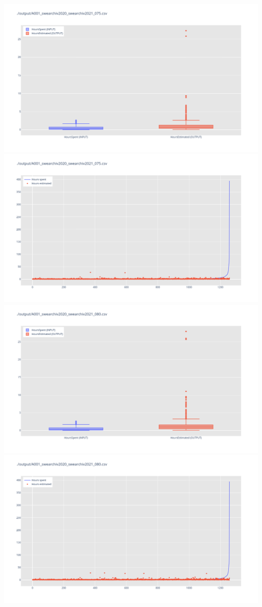\includegraphics[width=\textwidth]{Scripts/output/A001_swearchiv2020_swearchiv2021_075.csv.png}
\includegraphics[width=\textwidth]{Scripts/output/A001_swearchiv2020_swearchiv2021_075.csv.scatter.png}
\includegraphics[width=\textwidth]{Scripts/output/A001_swearchiv2020_swearchiv2021_080.csv.png}
\includegraphics[width=\textwidth]{Scripts/output/A001_swearchiv2020_swearchiv2021_080.csv.scatter.png}
